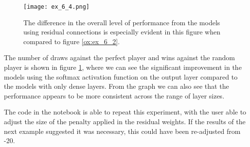 \documentclass{somasmsc}
\begin{document}
\begin{exa}
\begin{figure}[H]\label{ox:ex_6_4}
\begin{center}
\texttt{[image: ex\_6\_4.png]}
\end{center}
\caption{The difference in the overall level of performance from the models using residual connections is especially evident in this figure when compared to figure \ref{ox:ex_6_2}.}
\end{figure}

The number of draws against the perfect player and wins against the random player is shown in figure \ref{ox:ex_6_4}, where we can see the significant improvement in the models using the softmax activation function on the output layer compared to the models with only dense layers. From the graph we can also see that the performance appears to be more consistent across the range of layer sizes.

The code in the notebook is able to repeat this experiment, with the user able to adjust the size of the penalty applied in the residual weights. If the results of the next example suggested it was necessary, this could have been re-adjusted from -20.
\end{exa}
\end{document}
